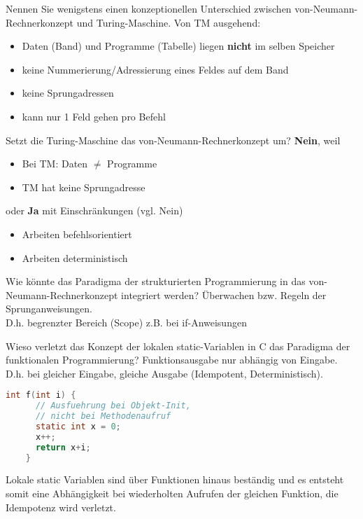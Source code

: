 \begin{card}
	Nennen Sie wenigstens einen konzeptionellen Unterschied zwischen von-Neumann-Rechnerkonzept und Turing-Maschine.
	\hr
	Von TM ausgehend:

	\begin{itemize}
  \item Daten (Band) und Programme (Tabelle) liegen \textbf{nicht} im selben Speicher
	\item keine Nummerierung/Adressierung eines Feldes auf dem Band
	\item keine Sprungadressen
	\item kann nur 1 Feld gehen pro Befehl
	\end{itemize}
\end{card}

\begin{card}
	Setzt die Turing-Maschine das von-Neumann-Rechnerkonzept um?
	\hr
	\textbf{Nein}, weil
	\begin{itemize}
	\item Bei TM: Daten $\neq$ Programme
	\item TM hat keine Sprungadresse
	\end{itemize}
	\vfill
	oder \textbf{Ja} mit Einschränkungen (vgl. Nein)
	\begin{itemize}
	\item Arbeiten befehlsorientiert
	\item Arbeiten deterministisch
	\end{itemize}
\end{card}

\begin{card}
	Wie könnte das Paradigma der strukturierten Programmierung in das von-Neumann-Rechnerkonzept integriert werden?
	\hr
	Überwachen bzw. Regeln der Sprunganweisungen.\\
	D.h. begrenzter Bereich (Scope) z.B. bei if-Anweisungen
\end{card}

\begin{card}
	Wieso verletzt das Konzept der lokalen static-Variablen in C das Paradigma der funktionalen
	Programmierung?
	\hr
	Funktionsausgabe nur abhängig von Eingabe. D.h. bei gleicher Eingabe, gleiche Ausgabe (Idempotent, Deterministisch).
	\begin{lstlisting}[language=C]
	int f(int i) {
	  // Ausfuehrung bei Objekt-Init,
	  // nicht bei Methodenaufruf
	  static int x = 0;
	  x++;
	  return x+i;
	}
	\end{lstlisting}
	Lokale static Variablen sind über Funktionen hinaus beständig und es entsteht somit eine Abhängigkeit bei wiederholten
	Aufrufen der gleichen Funktion, die Idempotenz wird verletzt.
\end{card}

